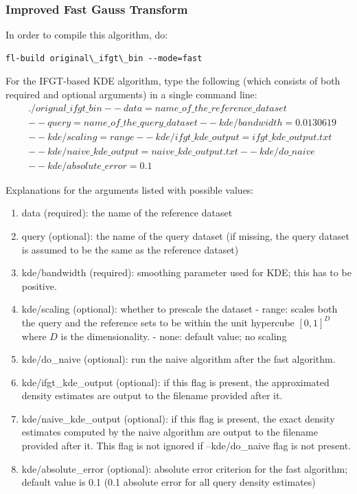 \documentclass[letter]{report}
\begin{document}
\subsubsection{Improved Fast Gauss Transform}
In order to compile this algorithm, do: 
\begin{verbatim}
fl-build original\_ifgt\_bin --mode=fast
\end{verbatim}

For the IFGT-based KDE algorithm, type the
following (which consists of both required and optional arguments) in
a single command line:
\begin{align*}
& \mathit{./orignal\_ifgt\_bin} \
\mathit{--data=name\_of\_the\_reference\_dataset}\\ &
\mathit{--query=name\_of\_the\_query\_dataset} \
\mathit{--kde/bandwidth=0.0130619} \\ & \mathit{--kde/scaling=range} \
\mathit{--kde/ifgt\_kde\_output=ifgt\_kde\_output.txt}\\ &
\mathit{--kde/naive\_kde\_output=naive\_kde\_output.txt} \
\mathit{--kde/do\_naive}\\ & \mathit{--kde/absolute\_error=0.1}
\end{align*}

Explanations for the arguments listed with possible values:

\begin{enumerate}
\item{data (required): the name of the reference dataset}
\item{query (optional): the name of the query dataset (if missing, the
 query dataset is assumed to be the same as the reference dataset)}
\item{kde/bandwidth (required): smoothing parameter used for KDE; this
 has to be positive.}
\item{kde/scaling (optional): whether to prescale the dataset - range:
scales both the query and the reference sets to be within the unit
hypercube $[0, 1]^D$ where $D$ is the dimensionality.  - none: default
value; no scaling}
\item{kde/do\_naive (optional): run the naive algorithm after the fast
algorithm.}
\item{kde/ifgt\_kde\_output (optional): if this flag is present, the
approximated density estimates are output to the filename provided
after it.}
\item{kde/naive\_kde\_output (optional): if this flag is present, the
 exact density estimates computed by the naive algorithm are output to
 the filename provided after it. This flag is not ignored if
 --kde/do\_naive flag is not present.}
\item{kde/absolute\_error (optional): absolute error criterion for the
 fast algorithm; default value is 0.1 (0.1 absolute error for all
 query density estimates)}
\end{enumerate}
\end{document}
